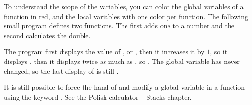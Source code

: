\documentclass[11pt,class=report,crop=false]{standalone}
\begin{document}
\begin{cours}
\begin{itemize}
\end{itemize}


To understand the scope of the variables, you can color the global variables of a function in red, and the local variables with one color per function.
The following small program defines two functions. The first adds one to a number and the second calculates the double.


The program first displays the value of , or , then it increases it by $1$, so it displays , then it displays twice as much as , so . The global variable  has never changed, so the last display of  is still .

\medskip

It is still possible to force the hand of \Python{} and modify a global variable in a function using the keyword . See the \og{}Polish calculator -- Stacks\fg{} chapter.

\end{cours}
\end{document}
